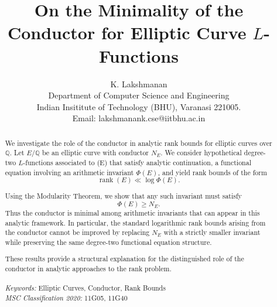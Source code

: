 \documentclass[a4paper,11pt]{article}
\theoremstyle{thmstyleone}%
\theoremstyle{thmstyletwo}%
\theoremstyle{thmstylethree}%
\begin{document}
	
	\title{On the Minimality of the Conductor for Elliptic Curve $L$-Functions}
		
	\author{K. Lakshmanan \\ Department of Computer Science and Engineering \\ Indian Insititute of Technology (BHU), Varanasi 221005.\\ Email: lakshmanank.cse@iitbhu.ac.in}
	\date{}
		
		\maketitle
	
	\begin{abstract}We investigate the role of the conductor in analytic rank bounds for elliptic curves over \(\mathbb{Q}\). Let \(E/\mathbb{Q}\) be an elliptic curve with conductor \(N_E\). We consider hypothetical degree-two \(L\)-functions associated to (E) that satisfy analytic continuation, a functional equation involving an arithmetic invariant \(\Phi(E)\), and yield rank bounds of the form
		\[
		\operatorname{rank}(E)\ll \log \Phi(E).
		\]
		
		Using the Modularity Theorem, we show that any such invariant must satisfy
		\[
		\Phi(E)\ge N_E.
		\]
		Thus the conductor is minimal among arithmetic invariants that can appear in this analytic framework. In particular, the standard logarithmic rank bounds arising from the conductor cannot be improved by replacing \(N_E\) with a strictly smaller invariant while preserving the same degree-two functional equation structure.
		
		These results provide a structural explanation for the distinguished role of the conductor in analytic approaches to the rank problem.\\
		\\
		\textit{Keywords:} Elliptic Curves, Conductor, Rank Bounds
		\\
		
		
		\noindent \textit{MSC Classification 2020:} 11G05, 11G40
		\end{abstract}
	
\end{document}
